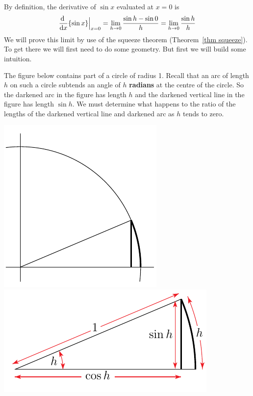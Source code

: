 By definition, the derivative of $\sin x$ evaluated at $x=0$ is
\begin{align*}
\diff{}{x} \{ \sin x \} \Big|_{x=0}
=\lim_{h\rightarrow 0}\frac{\sin h-\sin 0}{h}
=\lim_{h\rightarrow 0}\frac{\sin h}{h}
\end{align*}
We will prove this limit by use of the squeeze theorem (Theorem~\ref{thm squeeze}). To
get there we will first need to do some geometry. But first we will build some intuition.

The figure below contains part of a circle of radius 1. Recall that
an arc of length $h$ on such a circle subtends an angle of $h$
\textbf{radians} at the centre of the circle.
So the darkened arc in the figure has length $h$ and the darkened vertical
line in the figure has length $\sin h$. We must determine what happens
to the ratio of the lengths of the darkened vertical line
and darkened arc as $h$ tends to zero.

\begin{efig}
\begin{center}
     \includegraphics{sinDerivL}\qquad
     \includegraphics{sinDerivR}
\end{center}
\end{efig}

